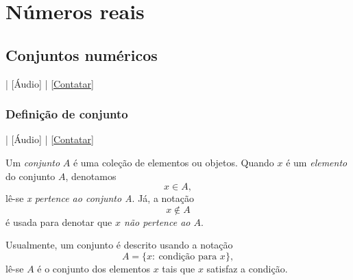 
\chapter{Números reais}\label{cap_numreal}
\thispagestyle{fancy}

\section{Conjuntos numéricos}\label{cap_numreal_sec_funconj}

\begin{flushright}
  [Vídeo] | [Áudio] | \href{https://phkonzen.github.io/notas/contato.html}{[Contatar]}
\end{flushright}

\subsection{Definição de conjunto}

\begin{flushright}
  [Vídeo] | [Áudio] | \href{https://phkonzen.github.io/notas/contato.html}{[Contatar]}
\end{flushright}

Um \emph{conjunto} $A$ é uma coleção de elementos ou objetos. Quando $x$ é um \emph{elemento} do conjunto $A$, denotamos
\begin{equation}
  x\in A,
\end{equation}
lê-se \emph{x pertence ao conjunto A}. Já, a notação
\begin{equation}
  x\not\in A
\end{equation}
é usada para denotar que \emph{$x$ não pertence ao $A$}.

Usualmente, um conjunto é descrito usando a notação
\begin{equation}
  A = \{x:~\text{condição para }x\},
\end{equation}
lê-se $A$ é o conjunto dos elementos $x$ tais que $x$ satisfaz a condição.


